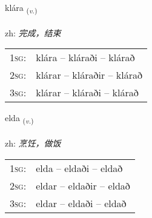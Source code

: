 \documentclass[frontgrid, backgrid]{flacards}\usepackage[]{graphicx}\usepackage[]{color}
\begin{document}
\renewcommand{\flhead}{\vskip5pt \fboxsep=0pt {\small\bfseries\footnotesize Sagnorð | 动词}}
\renewcommand{\fcfoot}{\vskip5pt \fboxsep=0pt \hspace{2pt}{\small\bfseries\footnotesize 2K}}

\renewcommand{\blhead}{\vskip5pt {\small\bfseries\footnotesize Sagnorð | 动词 }}
\renewcommand{\bcfoot}{\vskip5pt \hspace{2pt}{\small\bfseries\footnotesize 2K}}


{klára \small{\textsubscript{(\textit{v.})}} \\[1ex] %
\textphonetic{[kʰlauːra]} \\
zh: \emph{完成，结束} \\  [2ex]
\renewcommand*{\arraystretch}{0.8}
\begin{tabular}{p{1cm}l}
\textsc{1sg}: & klára -- kláraði -- klárað \\ 
\textsc{2sg}: & klárar -- kláraðir -- klárað \\ 
\textsc{3sg}: & klárar -- kláraði -- klárað \\ 
\end{tabular}
}

\renewcommand{\flhead}{\vskip5pt \fboxsep=0pt {\small\bfseries\footnotesize Sagnorð | 动词}}
\renewcommand{\fcfoot}{\vskip5pt \fboxsep=0pt \hspace{2pt}{\small\bfseries\footnotesize 2K}}

\renewcommand{\blhead}{\vskip5pt {\small\bfseries\footnotesize Sagnorð | 动词 }}
\renewcommand{\bcfoot}{\vskip5pt \hspace{2pt}{\small\bfseries\footnotesize 2K}}


{elda \small{\textsubscript{(\textit{v.})}} \\[1ex] %
\textphonetic{[ɛlta]} \\
zh: \emph{烹饪，做饭} \\  [2ex]
\renewcommand*{\arraystretch}{0.8}
\begin{tabular}{p{1cm}l}
\textsc{1sg}: & elda -- eldaði -- eldað \\ 
\textsc{2sg}: & eldar -- eldaðir -- eldað \\ 
\textsc{3sg}: & eldar -- eldaði -- eldað \\ 
\end{tabular}
}
\end{document}
